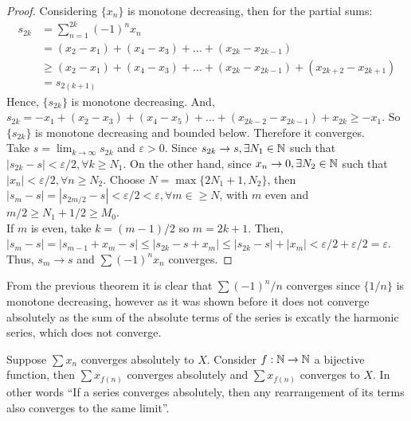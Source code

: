 \begin{proof}
    Considering $\{x_n\}$ is monotone decreasing, then for the partial sums:
    \begin{align*}
        s_{2k} &= \sum \limits_{n=1}^{2k} (-1)^n x_n \\
        &= (x_2-x_1) + (x_4-x_3) + ... + (x_{2k} - x_{2k-1}) \\
        &\geq (x_2-x_1) + (x_4-x_3) + ... + (x_{2k} - x_{2k-1}) + (x_{2k+2} - x_{2k+1}) \\
        &= s_{2(k+1)}
    \end{align*}
    Hence, $\{s_{2k}\}$ is monotone decreasing. And, $s_{2k} = -x_1 + (x_2-x_3) + (x_4-x_5) + ... + (x_{2k-2}-x_{2k-1}) + x_{2k} \geq -x_1$. So $\{s_{2k}\}$ is monotone decreasing and bounded below. Therefore it converges.  \\
    Take $s = \lim_{k\to \infty} s_{2k}$ and $\varepsilon > 0$. Since $s_{2k} \to s, \exists N_1 \in \mathbb{N}$ such that $|s_{2k} - s| < \varepsilon/2, \forall k \geq N_1$. On the other hand, since $x_n \to 0, \exists N_2 \in \mathbb{N}$ such that $|x_n| < \varepsilon/2, \forall n \geq N_2$. Choose $N = \max\{2N_1 + 1, N_2\}$, then $|s_m-s| = |s_{2m/2}-s| < \varepsilon/2 < \varepsilon, \forall m \in \geq N$, with $m$ even and $m/2 \geq N_1 + 1/2 \geq M_0$. \\
    If $m$ is even, take $k=(m-1)/2$ so $m = 2k + 1$. Then, $|s_m-s| = |s_{m-1} + x_m - s| \leq |s_{2k} - s + x_m| \leq |s_{2k} - s| + |x_m| < \varepsilon/2 + \varepsilon/2 = \varepsilon$.
    Thus, $s_m \to s$ and $\sum (-1)^n x_n$ converges.
\end{proof}

From the previous theorem it is clear that $\sum (-1)^n/n$ converges since $\{1/n\}$ is monotone decreasing, however as it was shown before it does not converge absolutely as the sum of the absolute terms of the series is excatly the harmonic series, which does not converge.

\begin{theorem}
    Suppose $\sum x_n$ converges absolutely to $X$. Consider $f: \mathbb{N} \to \mathbb{N}$ a bijective function, then $\sum x_{f(n)}$ converges absolutely and $\sum x_{f(n)}$ converges to $X$. In other words ``If a series converges absolutely, then any rearrangement of its terms also converges to the same limit''.
\end{theorem}


